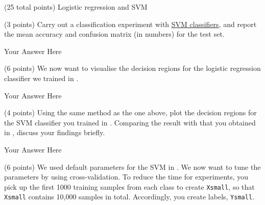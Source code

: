 \documentclass[12pt]{article}
\begin{document}
\begin{question}{(25 total points) Logistic regression and SVM}
\begin{subquestion}
   \end{subquestion}
   \begin{subquestion}{(3 points)
       Carry out a classification experiment with
       \href{https://scikit-learn.org/0.19/modules/generated/sklearn.svm.SVC.html}{SVM classifiers}, and report the
       mean accuracy and confusion matrix (in numbers) for the test
       set.
     } \label{Q2.2}


   

      \begin{answerbox}{30em}
         Your Answer Here
      \end{answerbox}
  


   \end{subquestion}
   \begin{subquestion}{(6 points)
       We now want to visualise the decision regions for the logistic
       regression classifier we trained in .
     } \label{Q2.3}


   

      \begin{answerbox}{35em}
         Your Answer Here
      \end{answerbox}
  


   \end{subquestion}
   \begin{subquestion}{(4 points)
       Using the same method as the one above, plot the decision regions for
       the SVM classifier you trained in .
       Comparing the result with that you obtained in , discuss your
       findings briefly.
     } \label{Q2.4}
   

      \begin{answerbox}{35em}
         Your Answer Here
      \end{answerbox}
  


   \end{subquestion}

   \begin{subquestion}{(6 points)
       We used default parameters for the SVM in .
       We now want to tune the parameters by using cross-validation.
       To reduce the time for experiments, you pick up the first 1000
       training samples from each class to create \texttt{Xsmall}, so that \texttt{Xsmall}
       contains 10,000 samples in total. Accordingly, you create
       labels, \texttt{Ysmall}.
     } \label{Q2.5}



\end{subquestion}
\end{question}
\end{document}
